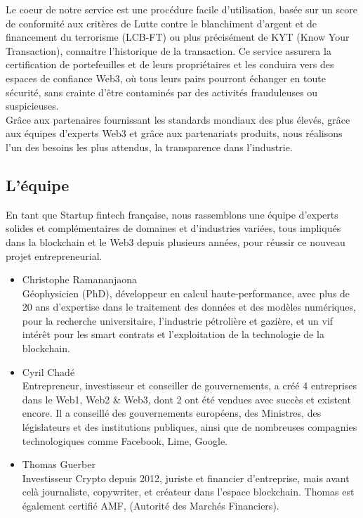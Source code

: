 ﻿\documentclass[a4paper]{article}
\newcommand{\smallvspace}{\vspace{4pt} \\}
\begin{document}
Le coeur de notre service est une procédure facile d’utilisation, basée sur un score de conformité aux critères de Lutte contre le blanchiment d'argent et de financement du terrorisme (LCB-FT) ou plus précisément de KYT (Know Your Transaction), connaitre l’historique de la transaction. Ce service assurera la certification de portefeuilles et de leurs propriétaires et les conduira vers des espaces de confiance Web3, où tous leurs pairs pourront échanger en toute sécurité, sans crainte d'être contaminés par des activités frauduleuses ou suspicieuses. \\

Grâce aux partenaires fournissant les standards mondiaux des plus élevés, grâce aux équipes d’experts Web3 et grâce aux partenariats produits, nous réalisons l’un des besoins les plus attendus, la transparence dans l’industrie.
\subsection{L’équipe}
En tant que Startup fintech française, nous rassemblons une équipe d’experts solides et complémentaires de domaines et d’industries variées, tous impliqués dans la blockchain et le Web3 depuis plusieurs années, pour réussir ce nouveau projet entrepreneurial.

\begin{itemize}
\item 
Christophe Ramananjaona \smallvspace
Géophysicien (PhD), développeur en calcul haute-performance, avec plus de 20 ans d’expertise dans le traitement des données et des modèles numériques, pour la recherche universitaire, l’industrie pétrolière et gazière, et un vif intérêt pour les smart contrats et l’exploitation de la technologie de la blockchain.

\item 
Cyril Chadé \smallvspace
Entrepreneur, investisseur et conseiller de gouvernements, a créé 4 entreprises dans le Web1, Web2 \& Web3, dont 2 ont été vendues avec succès et existent encore. Il a conseillé des gouvernements européens, des Ministres, des législateurs et des institutions publiques, ainsi que de nombreuses compagnies technologiques comme Facebook, Lime, Google.

\item 
Thomas Guerber \smallvspace
Investisseur Crypto depuis 2012, juriste et financier d’entreprise, mais avant celà journaliste, copywriter, et créateur dans l’espace blockchain. Thomas est également certifié AMF, (Autorité des Marchés Financiers).
\end{itemize}
\end{document}

